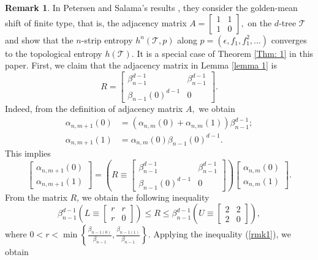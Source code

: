 \documentclass{amsart}
\theoremstyle{definition}
\newtheorem{remark}[theorem]{Remark}
\begin{document}
\begin{remark}\label{rmk4}
In Petersen and Salama's results \cite{petersen2020entropy}, they consider the golden-mean shift of finite type, that is, the adjacency matrix $A=\begin{bmatrix}
1&1\\
1&0
\end{bmatrix}
,$ on the $d$-tree $\mathcal{T}$ and show that the $n$-strip entropy $h^n(\mathcal{T},p)$ along $p=(\epsilon,f_1,f_1^2,...)$ converges to the topological entropy $h(\mathcal{T}).$ It is a special case of Theorem \ref{Thm: 1} in this paper. First, we claim that the adjacency matrix in Lemma \ref{lemma 1} is
\[
R=\begin{bmatrix}
    \beta_{n-1}^{d-1}&\beta_{n-1}^{d-1}\\
    \beta_{n-1}(0)^{d-1}&0
\end{bmatrix}.
\]
Indeed, from the definition of adjacency matrix $A,$ we obtain
\begin{align*}
    \alpha_{n,m+1}(0)&=(\alpha_{n,m}(0)+\alpha_{n,m}(1))\beta_{n-1}^{d-1};\\
    \alpha_{n,m+1}(1)&=\alpha_{n,m}(0)\beta_{n-1}(0)^{d-1}.
\end{align*}
This implies 
\[
\begin{bmatrix}
    \alpha_{n,m+1}(0)\\
    \alpha_{n,m+1}(1)
\end{bmatrix}=\left(R\equiv\begin{bmatrix}
    \beta_{n-1}^{d-1}&\beta_{n-1}^{d-1}\\
    \beta_{n-1}(0)^{d-1}&0
\end{bmatrix}\right)\begin{bmatrix}
    \alpha_{n,m}(0)\\
    \alpha_{n,m}(1)
\end{bmatrix}.
\]
From the matrix $R$, we obtain the following inequality
\begin{equation}\label{rmk1}
\beta_{n-1}^{d-1}\left(L\equiv\begin{bmatrix}
r&r\\
r&0
\end{bmatrix}\right)\leq R\leq \beta_{n-1}^{d-1} \left(U\equiv \begin{bmatrix}
2&2\\
2&0
\end{bmatrix}\right),
\end{equation}
where $0
<r<\min\left\{\frac{\beta_{n-1(0)}}{\beta_{n-1}},\frac{\beta_{n-1(1)}}{\beta_{n-1}}\right\}.$ Applying the inequality (\ref{rmk1}), we obtain 

\end{remark}
\end{document}
